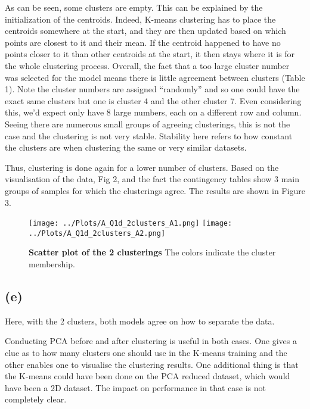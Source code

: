 \documentclass[12pt]{report} %
\begin{document}
As can be seen, some clusters are empty. This can be explained by the initialization of the centroids. Indeed, K-means clustering has to place the centroids somewhere at the start, and they are then updated based on which points are closest to it and their mean. If the centroid happened to have no points closer to it than other centroids at the start, it then stays where it is for the whole clustering process\cite{kmeans_sklearn}. Overall, the fact that a too large cluster number was selected for the model means there is little agreement between clusters (Table 1). Note the cluster numbers are assigned ``randomly'' and so one could have the exact same clusters but one is cluster 4 and the other cluster 7. Even considering this, we'd expect only have 8 large numbers, each on a different row and column. Seeing there are numerous small groups of agreeing clusterings, this is not the case and the clustering is not very stable. Stability here refers to how constant the clusters are when clustering the same or very similar datasets. 

Thus, clustering is done again for a lower number of clusters. Based on the visualisation of the data, Fig 2, and the fact the contingency tables show 3 main groups of samples for which the clusterings agree. The results are shown in Figure 3.  


\begin{figure}[htbp]
    \centering
    \texttt{[image: ../Plots/A\_Q1d\_2clusters\_A1.png]}
    \texttt{[image: ../Plots/A\_Q1d\_2clusters\_A2.png]}
    \caption{\textbf{Scatter plot of the 2 clusterings} The colors indicate the cluster membership.}
\end{figure}


\subsection*{(e)}

Here, with the 2 clusters, both models agree on how to separate the data. 

Conducting PCA before and after clustering is useful in both cases. One gives a clue as to how many clusters one should use in the K-means training and the other enables one to visualise the clustering results. One additional thing is that the K-means could have been done on the PCA reduced dataset, which would have been a 2D dataset. The impact on performance in that case is not completely clear.

\newpage
\end{document}
